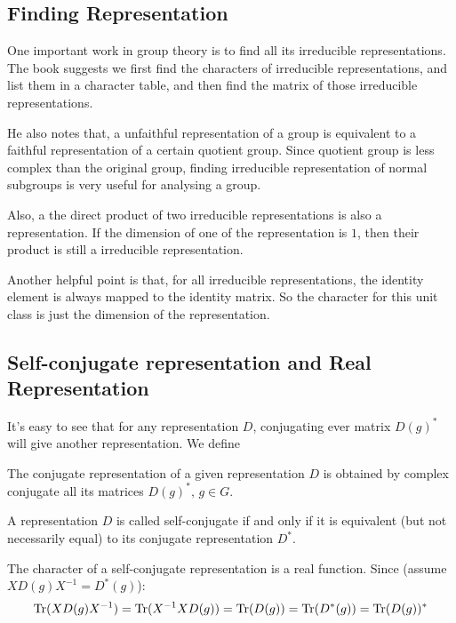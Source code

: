 \subsection{Finding Representation}
\label{sec:Finding-Representation}
One important work in group theory is to find all its irreducible
representations. The book \cite{book} suggests we first find the
characters of irreducible representations, and list them in a
character table, and then find the matrix of those irreducible
representations.

He also notes that, a unfaithful representation of a group is
equivalent to a faithful representation of a certain quotient group.
Since quotient group is less complex than the original group, finding
irreducible representation of normal subgroups is very useful for
analysing a group.

\begin{fact}
    Also, a the direct product of two irreducible representations is also
    a representation. If the dimension of one of the representation is
    $1$, then their product is still a irreducible representation.
\end{fact}
\begin{fact}
    \label{fact:character-of-identity}
    Another helpful point is that, for all irreducible
    representations, the identity element is always mapped to the
    identity matrix. So the character for this unit class is just the
    dimension of the representation.
\end{fact}
\subsection{Self-conjugate representation and Real Representation}
\label{sec:Self-conjugate-representation-and-Real-Representation}

It's easy to see that for any representation $D$, conjugating ever
matrix $D(g)^*$ will give another representation. We define
\begin{defi}
    The conjugate representation of a given representation $D$ is obtained
    by complex conjugate all its matrices $D(g)^*,\,g\in G$.
\end{defi}
\begin{defi}
    A representation $D$ is called self-conjugate if and only if it is
    equivalent (but not necessarily equal) to its conjugate
    representation $D^*$.
\end{defi}
\begin{fact}
    The character of a self-conjugate representation is a real
    function. Since (assume $XD(g)X^{-1}=D^*(g)$):
    $$
        \operatorname{Tr}(XD(g)X^{-1}) = \operatorname{Tr}(X^{-1}XD(g)) = \operatorname{Tr}(D(g)) = \operatorname{Tr}(D^*(g))
        = \operatorname{Tr}(D(g))^*
    $$
\end{fact}

